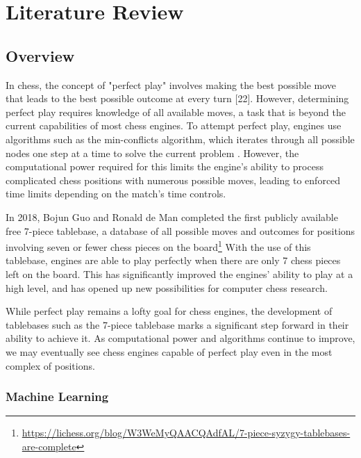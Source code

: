 
\chapter{Literature Review}
\begin{spacing}{2.0}

\section{Overview}

In chess, the concept of "perfect play" involves making the best possible move that leads to the best possible outcome at every turn [22]. However, determining perfect play requires knowledge of all available moves, a task that is beyond the current capabilities of most chess engines. To attempt perfect play, engines use algorithms such as the min-conflicts algorithm, which iterates through all possible nodes one step at a time to solve the current problem \cite{modernApproach}. However, the computational power required for this limits the engine's ability to process complicated chess positions with numerous possible moves, leading to enforced time limits depending on the match's time controls.

In 2018, Bojun Guo and Ronald de Man completed the first publicly available free 7-piece tablebase, a database of all possible moves and outcomes for positions involving seven or fewer chess pieces on the board\footnote{\url{https://lichess.org/blog/W3WeMyQAACQAdfAL/7-piece-syzygy-tablebases-are-complete}} With the use of this tablebase, engines are able to play perfectly when there are only 7 chess pieces left on the board. This has significantly improved the engines' ability to play at a high level, and has opened up new possibilities for computer chess research.

While perfect play remains a lofty goal for chess engines, the development of tablebases such as the 7-piece tablebase marks a significant step forward in their ability to achieve it. As computational power and algorithms continue to improve, we may eventually see chess engines capable of perfect play even in the most complex of positions.
 
\subsection{Machine Learning}


\end{spacing}
